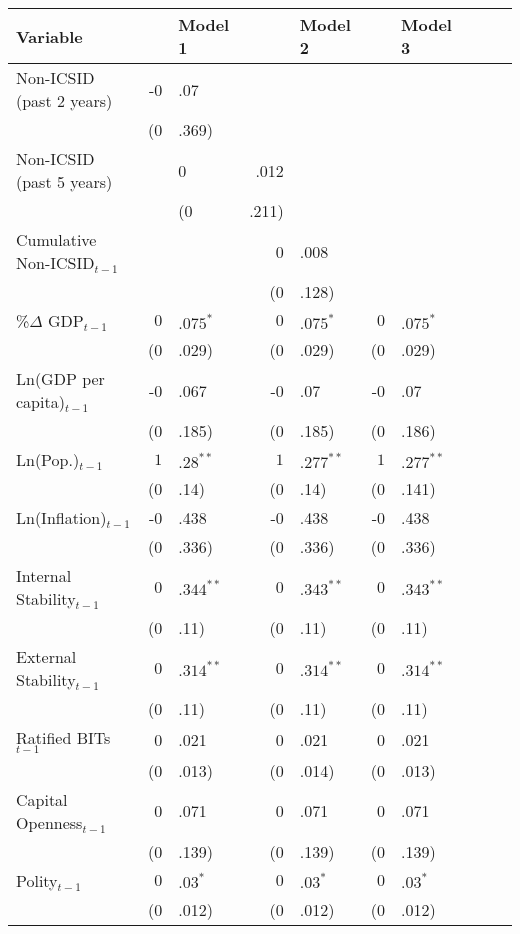 \begin{enumerate}
\begin{itemize}
			\begin{table}[ht]
			\centering
			\begingroup\footnotesize
			\begin{tabular}{lr@{} lr@{}lr@{}lr@{}lr@{}}
			Variable && Model 1 && Model 2 && Model 3 \\ 
			  \hline
			\hline
			Non-ICSID (past 2 years) & -0&.07 &  &  \\ 
			   & (0&.369) &  &  \\ 
			  Non-ICSID (past 5 years) &  & 0&.012 &  \\ 
			   &  & (0&.211) &  \\ 
			  Cumulative Non-ICSID$_{t-1}$ &  &  & 0&.008 \\ 
			   &  &  & (0&.128) \\ 
			  \%$\Delta$ GDP$_{t-1}$ & $0$&$.075^{\ast}$ & $0$&$.075^{\ast}$ & $0$&$.075^{\ast}$ \\ 
			   & (0&.029) & (0&.029) & (0&.029) \\ 
			  Ln(GDP per capita)$_{t-1}$ & -0&.067 & -0&.07 & -0&.07 \\ 
			   & (0&.185) & (0&.185) & (0&.186) \\ 
			  Ln(Pop.)$_{t-1}$ & $1$&$.28^{\ast\ast}$ & $1$&$.277^{\ast\ast}$ & $1$&$.277^{\ast\ast}$ \\ 
			   & (0&.14) & (0&.14) & (0&.141) \\ 
			  Ln(Inflation)$_{t-1}$ & -0&.438 & -0&.438 & -0&.438 \\ 
			   & (0&.336) & (0&.336) & (0&.336) \\ 
			  Internal Stability$_{t-1}$ & $0$&$.344^{\ast\ast}$ & $0$&$.343^{\ast\ast}$ & $0$&$.343^{\ast\ast}$ \\ 
			   & (0&.11) & (0&.11) & (0&.11) \\ 
			  External Stability$_{t-1}$ & $0$&$.314^{\ast\ast}$ & $0$&$.314^{\ast\ast}$ & $0$&$.314^{\ast\ast}$ \\ 
			   & (0&.11) & (0&.11) & (0&.11) \\ 
			  Ratified BITs$_{t-1}$ & 0&.021 & 0&.021 & 0&.021 \\ 
			   & (0&.013) & (0&.014) & (0&.013) \\ 
			  Capital Openness$_{t-1}$ & 0&.071 & 0&.071 & 0&.071 \\ 
			   & (0&.139) & (0&.139) & (0&.139) \\ 
			  Polity$_{t-1}$ & $0$&$.03^{\ast}$ & $0$&$.03^{\ast}$ & $0$&$.03^{\ast}$ \\ 
			   & (0&.012) & (0&.012) & (0&.012) \\ 

\end{tabular}
\end{table}
\end{itemize}
\end{enumerate}
